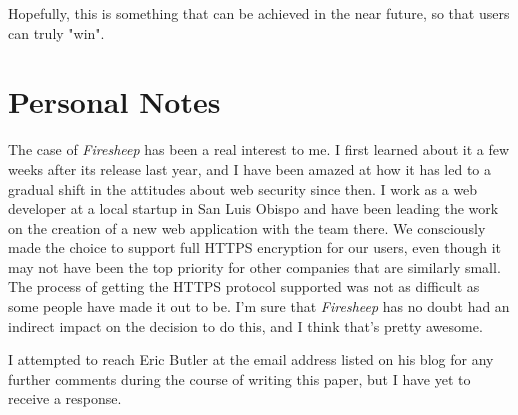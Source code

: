 \documentclass[11pt]{article}
\begin{document}
\begin{multicols}{2}
Hopefully, this is something that can be achieved in the near future, so that users can truly "win".

\section{Personal Notes}
The case of \emph{Firesheep} has been a real interest to me. I first learned about it a few weeks after its release last year, and I have been amazed at how it has led to a gradual shift in the attitudes about web security since then. I work as a web developer at a local startup in San Luis Obispo and have been leading the work on the creation of a new web application with the team there. We consciously made the choice to support full HTTPS encryption for our users, even though it may not have been the top priority for other companies that are similarly small. The process of getting the HTTPS protocol supported was not as difficult as some people have made it out to be. I'm sure that \emph{Firesheep} has no doubt had an indirect impact on the decision to do this, and I think that's pretty awesome.

I attempted to reach Eric Butler at the email address listed on his blog for any further comments during the course of writing this paper, but I have yet to receive a response.

\end{multicols}
\newpage
\nocite{*}


\end{document}
